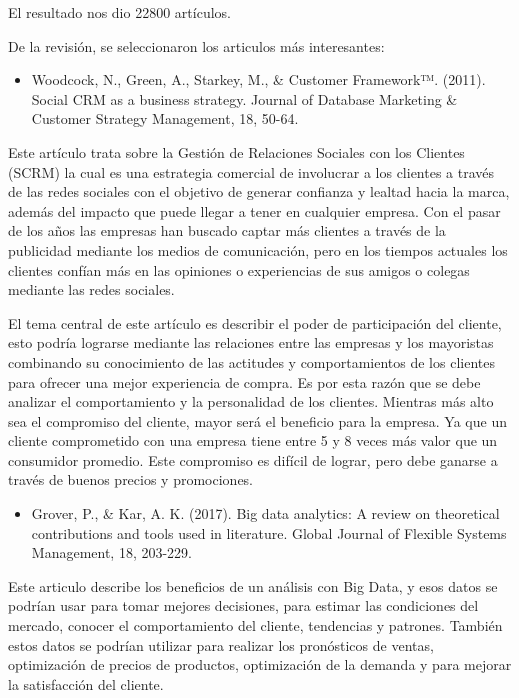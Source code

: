 \documentclass[Iberoamerican Journal of Industrial
Engineering,article,submit,moreauthors,pdftex]{Definitions/mdpi}
\providecommand{\tightlist}{%
  \setlength{\itemsep}{0pt}\setlength{\parskip}{0pt}}
\begin{document}
El resultado nos dio 22800 artículos.

De la revisión, se seleccionaron los articulos más interesantes:

\begin{itemize}
\tightlist
\item
  Woodcock, N., Green, A., Starkey, M., \& Customer Framework™. (2011).
  Social CRM as a business strategy. Journal of Database Marketing \&
  Customer Strategy Management, 18, 50-64.
\end{itemize}

Este artículo trata sobre la Gestión de Relaciones Sociales con los
Clientes (SCRM) la cual es una estrategia comercial de involucrar a los
clientes a través de las redes sociales con el objetivo de generar
confianza y lealtad hacia la marca, además del impacto que puede llegar
a tener en cualquier empresa. Con el pasar de los años las empresas han
buscado captar más clientes a través de la publicidad mediante los
medios de comunicación, pero en los tiempos actuales los clientes
confían más en las opiniones o experiencias de sus amigos o colegas
mediante las redes sociales.

El tema central de este artículo es describir el poder de participación
del cliente, esto podría lograrse mediante las relaciones entre las
empresas y los mayoristas combinando su conocimiento de las actitudes y
comportamientos de los clientes para ofrecer una mejor experiencia de
compra. Es por esta razón que se debe analizar el comportamiento y la
personalidad de los clientes. Mientras más alto sea el compromiso del
cliente, mayor será el beneficio para la empresa. Ya que un cliente
comprometido con una empresa tiene entre 5 y 8 veces más valor que un
consumidor promedio. Este compromiso es difícil de lograr, pero debe
ganarse a través de buenos precios y promociones.

\begin{itemize}
\tightlist
\item
  Grover, P., \& Kar, A. K. (2017). Big data analytics: A review on
  theoretical contributions and tools used in literature. Global Journal
  of Flexible Systems Management, 18, 203-229.
\end{itemize}

Este articulo describe los beneficios de un análisis con Big Data, y
esos datos se podrían usar para tomar mejores decisiones, para estimar
las condiciones del mercado, conocer el comportamiento del cliente,
tendencias y patrones. También estos datos se podrían utilizar para
realizar los pronósticos de ventas, optimización de precios de
productos, optimización de la demanda y para mejorar la satisfacción del
cliente.
\end{document}
